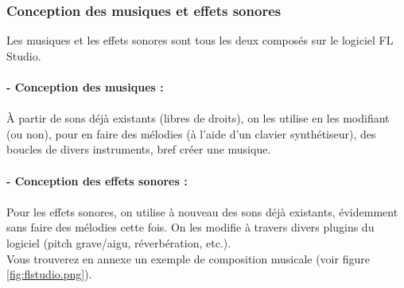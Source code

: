 \subsubsection{Conception des musiques et effets sonores}

Les musiques et les effets sonores sont tous les deux composés
sur le logiciel FL Studio.\\\\
\textbf{- Conception des musiques :}\\\\
À partir de sons déjà existants (libres de droits), on les
utilise en les modifiant (ou non), pour en faire des mélodies
(à l'aide d'un clavier synthétiseur), des boucles de divers instruments,
bref créer une musique.\\\\
\textbf{- Conception des effets sonores :}\\\\
Pour les effets sonores, on utilise à nouveau des sons déjà
existants, évidemment sans faire des mélodies cette fois. On les
modifie à travers divers plugins du logiciel (pitch grave/aigu,
réverbération, etc.).\\
Vous trouverez en annexe un exemple de composition musicale (voir figure \ref{fig:flstudio.png}).
